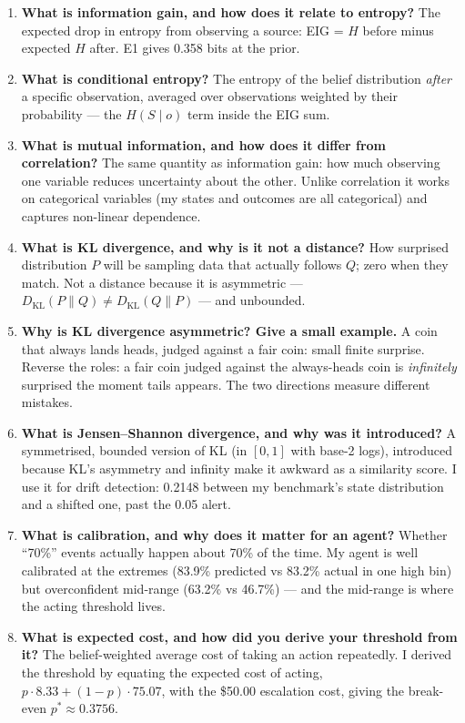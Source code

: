 \documentclass{article}
\begin{document}
\begin{enumerate}
\item \textbf{What is information gain, and how does it relate to entropy?} The expected drop in entropy from observing a source: EIG = $H$ before minus expected $H$ after. E1 gives 0.358 bits at the prior.
\item \textbf{What is conditional entropy?} The entropy of the belief distribution \emph{after} a specific observation, averaged over observations weighted by their probability --- the $H(S \mid o)$ term inside the EIG sum.
\item \textbf{What is mutual information, and how does it differ from correlation?} The same quantity as information gain: how much observing one variable reduces uncertainty about the other. Unlike correlation it works on categorical variables (my states and outcomes are all categorical) and captures non-linear dependence.
\item \textbf{What is KL divergence, and why is it not a distance?} How surprised distribution $P$ will be sampling data that actually follows $Q$; zero when they match. Not a distance because it is asymmetric --- $D_{\mathrm{KL}}(P\|Q) \neq D_{\mathrm{KL}}(Q\|P)$ --- and unbounded.
\item \textbf{Why is KL divergence asymmetric? Give a small example.} A coin that always lands heads, judged against a fair coin: small finite surprise. Reverse the roles: a fair coin judged against the always-heads coin is \emph{infinitely} surprised the moment tails appears. The two directions measure different mistakes.
\item \textbf{What is Jensen--Shannon divergence, and why was it introduced?} A symmetrised, bounded version of KL (in $[0,1]$ with base-2 logs), introduced because KL's asymmetry and infinity make it awkward as a similarity score. I use it for drift detection: 0.2148 between my benchmark's state distribution and a shifted one, past the 0.05 alert.
\item \textbf{What is calibration, and why does it matter for an agent?} Whether ``70\%'' events actually happen about 70\% of the time. My agent is well calibrated at the extremes (83.9\% predicted vs 83.2\% actual in one high bin) but overconfident mid-range (63.2\% vs 46.7\%) --- and the mid-range is where the acting threshold lives.
\item \textbf{What is expected cost, and how did you derive your threshold from it?} The belief-weighted average cost of taking an action repeatedly. I derived the threshold by equating the expected cost of acting, $p \cdot 8.33 + (1-p) \cdot 75.07$, with the \$50.00 escalation cost, giving the break-even $p^{*} \approx 0.3756$.

\end{enumerate}
\end{document}
